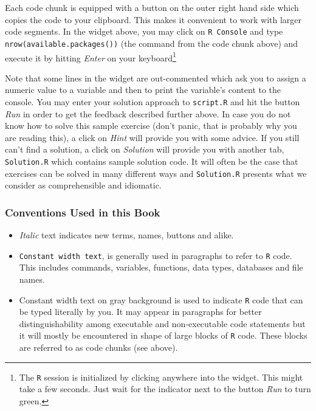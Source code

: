 \documentclass[]{book}
\let\rmarkdownfootnote\footnote%
\def\footnote{\protect\rmarkdownfootnote}
\theoremstyle{definition}
\theoremstyle{definition}
\theoremstyle{definition}
\theoremstyle{remark}
\begin{document}
Each code chunk is equipped with a button on the outer right hand side
which copies the code to your clipboard. This makes it convenient to
work with larger code segments. In the widget above, you may click on
\texttt{R Console} and type \texttt{nrow(available.packages())} (the
command from the code chunk above) and execute it by hitting
\emph{Enter} on your keyboard\footnote{The \texttt{R} session is
  initialized by clicking anywhere into the widget. This might take a
  few seconds. Just wait for the indicator next to the button \emph{Run}
  to turn green.}

Note that some lines in the widget are out-commented which ask you to
assign a numeric value to a variable and then to print the variable's
content to the console. You may enter your solution approach to
\texttt{script.R} and hit the button \emph{Run} in order to get the
feedback described further above. In case you do not know how to solve
this sample exercise (don't panic, that is probably why you are reading
this), a click on \emph{Hint} will provide you with some advice. If you
still can't find a solution, a click on \emph{Solution} will provide you
with another tab, \texttt{Solution.R} which contains sample solution
code. It will often be the case that exercises can be solved in many
different ways and \texttt{Solution.R} presents what we consider as
comprehensible and idiomatic.

\subsubsection*{Conventions Used in this
Book}\label{conventions-used-in-this-book}

\begin{itemize}
\item
  \emph{Italic} text indicates new terms, names, buttons and alike.
\item
  \texttt{Constant width text}, is generally used in paragraphs to refer
  to \texttt{R} code. This includes commands, variables, functions, data
  types, databases and file names.
\item
  Constant width text on gray background is used to indicate \texttt{R}
  code that can be typed literally by you. It may appear in paragraphs
  for better distinguishability among executable and non-executable code
  statements but it will mostly be encountered in shape of large blocks
  of \texttt{R} code. These blocks are referred to as code chunks (see
  above).
\end{itemize}
\end{document}

